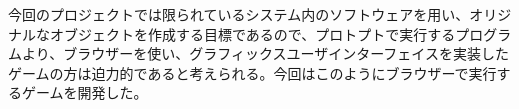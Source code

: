 今回のプロジェクトでは限られているシステム内のソフトウェアを用い、オリジナルなオブジェクトを作成する目標であるので、プロトプトで実行するプログラムより、ブラウザーを使い、グラフィックスユーザインターフェイスを実装したゲームの方は迫力的であると考えられる。今回はこのようにブラウザーで実行するゲームを開発した。